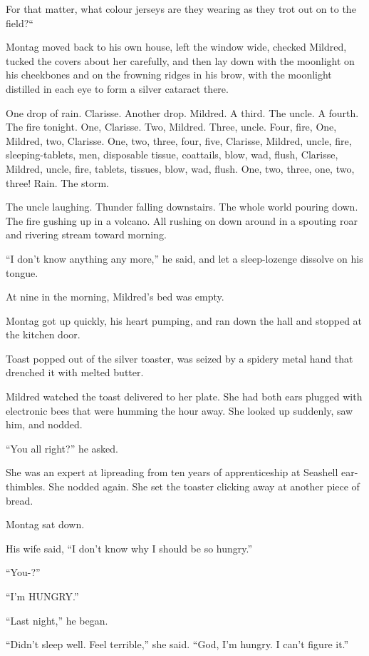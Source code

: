 \documentclass[11pt,openany]{book}
\begin{document}
For that matter, what colour jerseys are they wearing as they trot out on to the field?``

Montag moved back to his own house, left the window wide, checked Mildred, tucked the covers about her carefully, and then lay down with the moonlight on his cheekbones and on the frowning ridges in his brow, with the moonlight distilled in each eye to form a silver cataract there.

One drop of rain. Clarisse. Another drop. Mildred. A third. The uncle. A fourth. The fire tonight. One, Clarisse. Two, Mildred. Three, uncle. Four, fire, One, Mildred, two, Clarisse. One, two, three, four, five, Clarisse, Mildred, uncle, fire, sleeping-tablets, men, disposable tissue, coattails, blow, wad, flush, Clarisse, Mildred, uncle, fire, tablets, tissues, blow, wad, flush. One, two, three, one, two, three! Rain. The storm.

The uncle laughing. Thunder falling downstairs. The whole world pouring down. The fire gushing up in a volcano. All rushing on down around in a spouting roar and rivering stream toward morning.

``I don't know anything any more,'' he said, and let a sleep-lozenge dissolve on his tongue.

At nine in the morning, Mildred's bed was empty.

Montag got up quickly, his heart pumping, and ran down the hall and stopped at the kitchen door.

Toast popped out of the silver toaster, was seized by a spidery metal hand that drenched it with melted butter.

Mildred watched the toast delivered to her plate. She had both ears plugged with electronic bees that were humming the hour away. She looked up suddenly, saw him, and nodded.

``You all right?'' he asked.

She was an expert at lipreading from ten years of apprenticeship at Seashell ear-thimbles. She nodded again. She set the toaster clicking away at another piece of bread.

Montag sat down.

His wife said, ``I don't know why I should be so hungry.''

``You-?''

``I'm HUNGRY.''

``Last night,'' he began.

``Didn't sleep well. Feel terrible,'' she said. ``God, I'm hungry. I can't figure it.''
\end{document}
